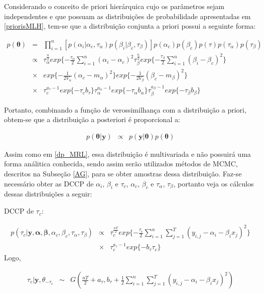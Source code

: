 \documentclass[12pt,a4paper,header]{abnt}
\def\bs{\boldsymbol}
\begin{document}
Considerando o conceito de priori hierárquica cujo os parâmetros sejam independentes e que possuam as distribuições de probabilidade apresentadas em \ref{priorisMLH}, tem-se que a distribuição conjunta a priori possui a seguinte forma:

\begin{eqnarray}
p(\bs{\theta}) &=& \prod^n_{i=1} [ p(\alpha_i | \alpha_c, \tau_\alpha) p(\beta_i | \beta_c, \tau_\beta )]p(\alpha_c)p(\beta_c)p(\tau)p(\tau_\alpha)p(\tau_\beta) \\
%
&\propto& \tau_\alpha^{\frac{n}{2}} exp\{ -\frac{\tau_\alpha}{2} \sum^n_{i=1}(\alpha_i-\alpha_c)^2
\tau_\beta^{\frac{n}{2}} exp\{ -\frac{\tau_\beta}{2} \sum^n_{i=1}(\beta_i-\beta_c)^2\} \\
%
&\times& exp\{ -\frac{1}{2 V_\alpha} (\alpha_c-m_\alpha)^2 \}  exp\{ -\frac{1}{2 V_\beta } (\beta_c-m_\beta)^2 \} \\
%
&\times& \tau_c^{a_\tau -1} exp\{ -\tau_c b_\tau \} \tau_\alpha^{a_\alpha -1} exp\{ -\tau_\alpha b_\alpha \} \tau_\beta^{a_\beta -1} exp\{ -\tau_\beta b_\beta \}
\end{eqnarray}

Portanto, combinando a função de verossimilhança com a distribuição a priori, obtem-se que a distribuição a posteriori é proporcional a:

\begin{eqnarray}
p(\bs{\theta} | \bs{y} ) &\propto&  p(\bs{y} | \bs{\theta}  ) p(\bs{\theta}  )
\end{eqnarray}

Assim como em \ref{dp_MRL}, essa distribuição é multivariada e não possuirá uma forma análitica conhecida, sendo assim serão utilizados métodos de \ac{MCMC}, descritos na Subseção \ref{AG}, para se obter amostras dessa distribuição. Faz-se necessário obter as \ac{DCCP} de $\alpha_i$, $\beta_i$ e $\tau_c$, $\alpha_c$, $\beta_c$ e $\tau_\alpha$, $\tau_\beta$, portanto veja os cálculos dessas distribuições a seguir:

\ac{DCCP} de $\tau_c$:

\begin{eqnarray}
p(\tau_c | \bs{y}, \bs{\alpha}, \bs{\beta},\alpha_c,\beta_c, \tau_\alpha, \tau_\beta) &\propto& \tau_c^\frac{nT}{2} exp\{ - \frac{\tau_c}{2}  \sum^n_{i=1} \sum^T_{j=1} (y_{i,j} -\alpha_i - \beta_i x_j)^2 \} \\
&\times& \tau_c^{a_\tau - 1} exp\{ -b_\tau \tau_c \}
\end{eqnarray}
Logo,

\begin{eqnarray}
\tau_c | \bs{y}, \theta_{-\tau_c}  &\sim& G(\frac{nT}{2}+a_\tau , b_\tau + \frac{1}{2}\sum^n_{i=1} \sum^T_{j=1} (y_{i,j} -\alpha_i - \beta_ix_j)^2 )
\end{eqnarray}
\end{document}
